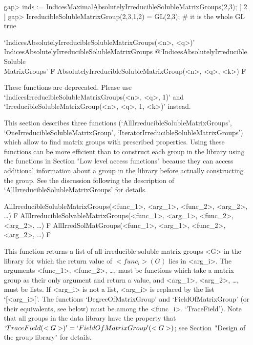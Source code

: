 \beginexample
gap> inds := IndicesMaximalAbsolutelyIrreducibleSolubleMatrixGroups(2,3);
[ 2 ] 
gap> IrreducibleSolubleMatrixGroup(2,3,1,2) = GL(2,3); # it is the whole GL
true
\endexample


\>`IndicesAbsolutelyIrreducibleSolubleMatrixGroups(<n>, <q>)'%
{IndicesAbsolutelyIrreducibleSolubleMatrixGroups}%
@{`IndicesAbsolutelyIrreducible\\Soluble\\MatrixGroups'} F
\>AbsolutelyIrreducibleSolubleMatrixGroup(<n>, <q>,  <k>) F

These functions are deprecated.  Please use `IndicesIrreducibleSolubleMatrixGroups(<n>, <q>, 1)' and `IrreducibleSolubleMatrixGroup(<n>, <q>, 1, <k>)' instead.



This section describes three functions
(`AllIrreducibleSolubleMatrixGroups',
`OneIrreducibleSolubleMatrixGroup',
`IteratorIrreducibleSolubleMatrixGroups') which allow to find matrix
groups with prescribed properties. Using these functions can be more efficient
than to construct each group in the library using the functions in Section
"Low level access functions" because they can access additional information 
about a group in the {\IRREDSOL} library before actually constructing the group. 
See the discussion following the description of 
`AllIrreducibleSolubleMatrixGroups' for details. 

\>AllIrreducibleSolubleMatrixGroups(<func_1>, <arg_1>, <func_2>, <arg_2>, \dots) F
\>AllIrreducibleSolvableMatrixGroups(<func_1>, <arg_1>, <func_2>, <arg_2>, \dots) F
\>AllIrredSolMatGroups(<func_1>, <arg_1>, <func_2>, <arg_2>, \dots) F

This function returns a list of all irreducible soluble matrix
groups <G> in the {\IRREDSOL} library for which the return value of $<func_i>(G)$ lies in
<arg_i>.  The arguments <func_1>, <func_2>, \dots,
must be {\GAP} functions which take a matrix group as their only argument and
return a value, and <arg_1>, <arg_2>,
\dots,  must be lists. If <arg_i> is not a list, <arg_i> is replaced by the list
`[<arg_i>]'. The functions `DegreeOfMatrixGroup' and `FieldOfMatrixGroup' (or their equivalents, see below) must be among the <func_i>. 
`TraceField'). Note that all groups in the data library have the property that 
$`TraceField(<G>)' = `FieldOfMatrixGroup'(<G>)$; see Section~"Design of the group library" 
for details. 

